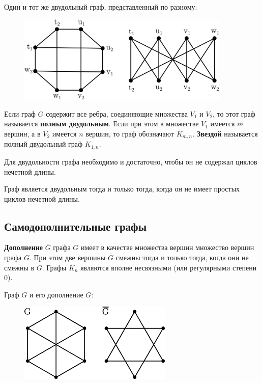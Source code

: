 \begin{example*}
    Один и тот же двудольный граф, представленный по разному:
    \begin{figure}[H]
        \centering
        \includegraphics[width=0.9\textwidth]{images/bipartite-graphs.png}
    \end{figure}
\end{example*}

Если граф \(G\) содержит все ребра, соединяющие множества \(V_1\) и \(V_2\), то этот граф называется \textbf{полным двудольным}. Если при этом в множестве \(V_1\) имеется \(m\) вершин, а в \(V_2\) имеется \(n\) вершин, то граф обозначают \(K_{m, n}\). \textbf{Звездой} называется полный двудольный граф \(K_{1, n}\).

\begin{theorem*}[Кенига]
    Для двудольности графа необходимо и достаточно, чтобы он не содержал циклов нечетной длины.
    \begin{consequence*}
        Граф является двудольным тогда и только тогда, когда он не имеет простых циклов нечетной длины.
    \end{consequence*}
\end{theorem*}

\subsection{Самодополнительные графы}

\textbf{Дополнение} \(\bar{G}\) графа \(G\) имеет в качестве множества вершин множество вершин графа \(G\). При этом две вершины \(\bar{G}\) смежны тогда и только тогда, когда они не смежны в \(G\). Графы \(\bar{K}_n\) являются вполне несвязными (или регулярными степени \(0\)).

\begin{example*}
    Граф \(G\) и его дополнение \(\bar{G}\):
    \begin{figure}[H]
        \centering
        \includegraphics[width=0.65\textwidth]{images/complement-graph.png}
    \end{figure}
\end{example*}

